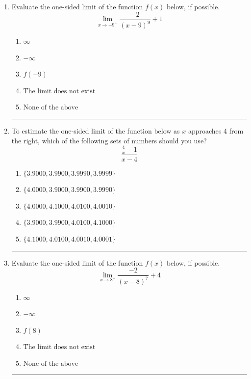 \documentclass[14pt]{extbook}
\newcommand{\litem}[1]{\item#1\hspace*{-1cm}\rule{\textwidth}{0.4pt}}
\begin{document}
\begin{enumerate}
\litem{
Evaluate the one-sided limit of the function $f(x)$ below, if possible.\[ \lim_{x \rightarrow -9^+} \frac{-2}{(x-9)^9}+1 \]\begin{enumerate}[label=\Alph*.]
\item \( \infty \)
\item \( -\infty \)
\item \( f(-9) \)
\item \( \text{The limit does not exist} \)
\item \( \text{None of the above} \)

\end{enumerate} }
\litem{
To estimate the one-sided limit of the function below as $x$ approaches 4 from the right, which of the following sets of numbers should you use?\[ \frac{\frac{4}{x} - 1}{x - 4} \]\begin{enumerate}[label=\Alph*.]
\item \( \{ 3.9000, 3.9900, 3.9990, 3.9999 \} \)
\item \( \{ 4.0000, 3.9000, 3.9900, 3.9990 \} \)
\item \( \{ 4.0000, 4.1000, 4.0100, 4.0010 \} \)
\item \( \{ 3.9000, 3.9900, 4.0100, 4.1000 \} \)
\item \( \{ 4.1000, 4.0100, 4.0010, 4.0001 \} \)

\end{enumerate} }
\litem{
Evaluate the one-sided limit of the function $f(x)$ below, if possible.\[ \lim_{x \rightarrow 8^-} \frac{-2}{(x-8)^7}+4 \]\begin{enumerate}[label=\Alph*.]
\item \( \infty \)
\item \( -\infty \)
\item \( f(8) \)
\item \( \text{The limit does not exist} \)
\item \( \text{None of the above} \)


\end{enumerate}}
\end{enumerate}
\end{document}
